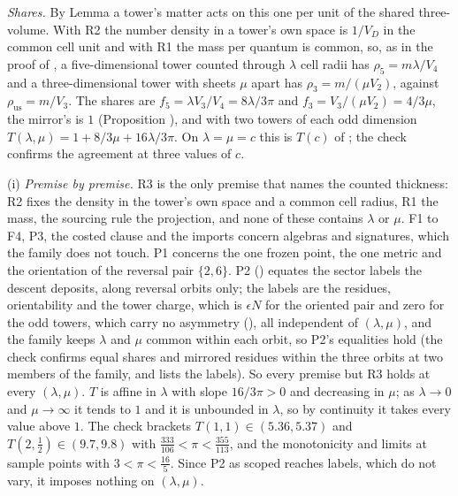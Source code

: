 \emph{Shares.} By Lemma  a tower's matter acts on this one per unit of the shared three-volume. With R2 the number density in a tower's own space is $1/V_{D}$ in the common cell unit and with R1 the mass per quantum is common, so, as in the proof of , a five-dimensional tower counted through $\lambda$ cell radii has $\rho_{5} = m\lambda/V_{4}$ and a three-dimensional tower with sheets $\mu$ apart has $\rho_{3} = m/(\mu V_{2})$, against $\rho_{\mathrm{us}} = m/V_{3}$. The shares are $f_{5} = \lambda V_{3}/V_{4} = 8\lambda/3\pi$ and $f_{3} = V_{3}/(\mu V_{2}) = 4/3\mu$, the mirror's is $1$ (Proposition ), and with two towers of each odd dimension $T(\lambda,\mu) = 1 + 8/3\mu + 16\lambda/3\pi$. On $\lambda = \mu = c$ this is $T(c)$ of ; the check confirms the agreement at three values of $c$.

(i) \emph{Premise by premise.} R3 is the only premise that names the counted thickness: R2 fixes the density in the tower's own space and a common cell radius, R1 the mass, the sourcing rule the projection, and none of these contains $\lambda$ or $\mu$. F1 to F4, P3, the costed clause and the imports concern algebras and signatures, which the family does not touch. P1 concerns the one frozen point, the one metric and the orientation of the reversal pair $\{2, 6\}$. P2 () equates the sector labels the descent deposits, along reversal orbits only; the labels are the residues, orientability and the tower charge, which is $\epsilon N$ for the oriented pair and zero for the odd towers, which carry no asymmetry (), all independent of $(\lambda, \mu)$, and the family keeps $\lambda$ and $\mu$ common within each orbit, so P2's equalities hold (the check confirms equal shares and mirrored residues within the three orbits at two members of the family, and lists the labels). So every premise but R3 holds at every $(\lambda, \mu)$. $T$ is affine in $\lambda$ with slope $16/3\pi > 0$ and decreasing in $\mu$; as $\lambda \to 0$ and $\mu \to \infty$ it tends to $1$ and it is unbounded in $\lambda$, so by continuity it takes every value above $1$. The check brackets $T(1,1) \in (5.36, 5.37)$ and $T(2, \tfrac12) \in (9.7, 9.8)$ with $\tfrac{333}{106} < \pi < \tfrac{355}{113}$, and the monotonicity and limits at sample points with $3 < \pi < \tfrac{16}{5}$. Since P2 as scoped reaches labels, which do not vary, it imposes nothing on $(\lambda,\mu)$.

